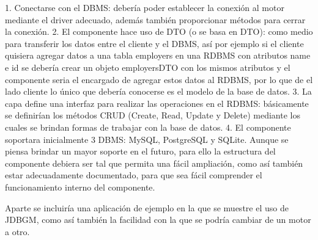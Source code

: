 1. Conectarse con el DBMS: debería poder establecer la conexión al motor mediante el driver adecuado, además también proporcionar métodos para cerrar la conexión.
2. El componente hace uso de DTO (o se basa en DTO): como medio para transferir los datos entre el cliente y el DBMS, así por ejemplo si el cliente quisiera agregar datos a una tabla employers en una RDBMS con atributos name e id se debería crear un objeto employersDTO con los mismos atributos y  el componente seria el encargado de agregar estos datos al RDBMS, por lo que de el lado cliente lo único que debería conocerse es el modelo de la base de datos.
3. La capa define una interfaz para realizar las operaciones en el RDBMS: básicamente se definirían los métodos CRUD (Create, Read, Update y Delete) mediante los cuales se brindan formas de trabajar con la base de datos.
4. El componente soportara inicialmente 3 DBMS: MySQL, PostgreSQL y SQLite. Aunque se piensa brindar un mayor soporte en el futuro, para ello la estructura del componente debiera ser tal que permita una fácil ampliación, como así también estar adecuadamente documentado, para que sea fácil comprender el funcionamiento interno del componente.

Aparte se incluiría una aplicación de ejemplo en la que se muestre el uso de JDBGM, como así también la facilidad con la que se podría cambiar de un motor a otro.  



